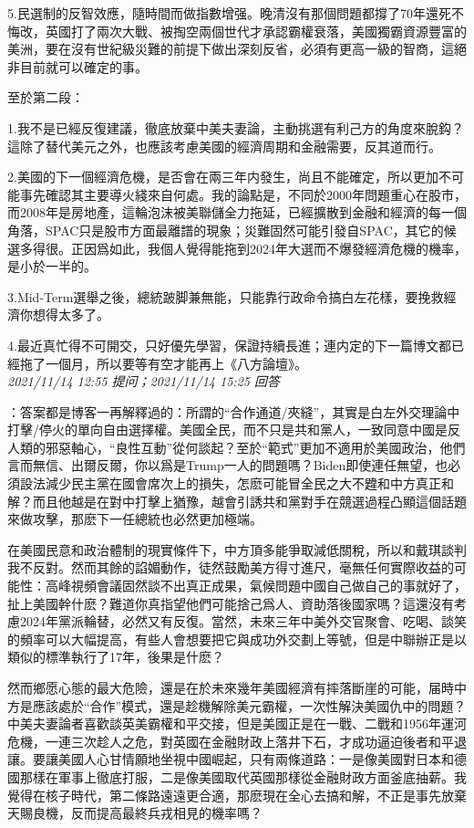 \documentclass[twocolumn]{ctexart}
\begin{document}
5.民選制的反智效應，隨時間而做指數增强。晚清沒有那個問題都撐了70年還死不悔改，英國打了兩次大戰、被掏空兩個世代才承認霸權衰落，美國獨霸資源豐富的美洲，要在沒有世紀級災難的前提下做出深刻反省，必須有更高一級的智商，這絕非目前就可以確定的事。

至於第二段：

1.我不是已經反復建議，徹底放棄中美夫妻論，主動挑選有利己方的角度來脫鈎？這除了替代美元之外，也應該考慮美國的經濟周期和金融需要，反其道而行。

2.美國的下一個經濟危機，是否會在兩三年内發生，尚且不能確定，所以更加不可能事先確認其主要導火綫來自何處。我的論點是，不同於2000年問題重心在股市，而2008年是房地產，這輪泡沫被美聯儲全力拖延，已經擴散到金融和經濟的每一個角落，SPAC只是股市方面最離譜的現象；災難固然可能引發自SPAC，其它的候選多得很。正因爲如此，我個人覺得能拖到2024年大選而不爆發經濟危機的機率，是小於一半的。

3.Mid-Term選舉之後，總統跛脚兼無能，只能靠行政命令搞白左花樣，要挽救經濟你想得太多了。

4.最近真忙得不可開交，只好優先學習，保證持續長進；連内定的下一篇博文都已經拖了一個月，所以要等有空才能再上《八方論壇》。
\\

\textit{\hfill\noindent\small 2021/11/14 12:55 提问；2021/11/14 15:25 回答}

：答案都是博客一再解釋過的：所謂的“合作通道/夾縫”，其實是白左外交理論中打擊/停火的單向自由選擇權。美國全民，而不只是共和黨人，一致同意中國是反人類的邪惡軸心，“良性互動”從何談起？至於“範式”更加不適用於美國政治，他們言而無信、出爾反爾，你以爲是Trump一人的問題嗎？Biden即使連任無望，也必須設法減少民主黨在國會席次上的損失，怎麽可能冒全民之大不韙和中方真正和解？而且他越是在對中打擊上猶豫，越會引誘共和黨對手在競選過程凸顯這個話題來做攻擊，那麽下一任總統也必然更加極端。

在美國民意和政治體制的現實條件下，中方頂多能爭取減低關稅，所以和戴琪談判我不反對。然而其餘的諂媚動作，徒然鼓勵美方得寸進尺，毫無任何實際收益的可能性：高峰視頻會議固然談不出真正成果，氣候問題中國自己做自己的事就好了，扯上美國幹什麽？難道你真指望他們可能捨己爲人、資助落後國家嗎？這還沒有考慮2024年黨派輪替，必然又有反復。當然，未來三年中美外交官聚會、吃喝、談笑的頻率可以大幅提高，有些人會想要把它與成功外交劃上等號，但是中聯辦正是以類似的標準執行了17年，後果是什麽？

然而鄉愿心態的最大危險，還是在於未來幾年美國經濟有摔落斷崖的可能，届時中方是應該處於“合作”模式，還是趁機解除美元霸權，一次性解決美國仇中的問題？中美夫妻論者喜歡談英美霸權和平交接，但是美國正是在一戰、二戰和1956年運河危機，一連三次趁人之危，對英國在金融財政上落井下石，才成功逼迫後者和平退讓。要讓美國人心甘情願地坐視中國崛起，只有兩條道路：一是像美國對日本和德國那樣在軍事上徹底打服，二是像美國取代英國那樣從金融財政方面釜底抽薪。我覺得在核子時代，第二條路遠遠更合適，那麽現在全心去搞和解，不正是事先放棄天賜良機，反而提高最終兵戎相見的機率嗎？
\\
\end{document}
